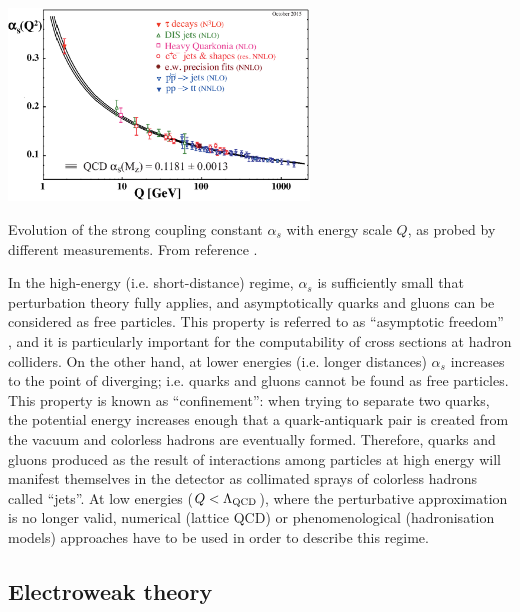 \bfig[h!]
\centering
\includegraphics[width=0.6\textwidth]{figures/Theory/asq-2015.eps}
\captionsetup{width=0.85\textwidth} \caption{\small Evolution of the strong coupling constant $\alpha_s$ with energy scale $Q$, as probed by different measurements. From reference \cite{Bethke:2015etp}.}
\label{sec:theo:fig:alpha}
\efig


In the high-energy (i.e. short-distance) regime, $\alpha_{s}$ is sufficiently small that perturbation theory fully applies, and asymptotically quarks and gluons can be considered as free particles. This property is referred to as ``asymptotic freedom'' \cite{Politzer:1973fx,Gross:1973id}, and it is particularly important for the computability of cross sections at hadron colliders.
On the other hand, at lower energies (i.e. longer distances) $\alpha_{s}$ increases to the point of diverging; i.e. quarks and gluons cannot be found as free particles. This property is known as ``confinement'': when trying to separate two quarks, the potential energy increases enough that a quark-antiquark pair is created from the vacuum and colorless hadrons are eventually formed. Therefore, quarks and gluons produced as the result of interactions among particles at high energy will manifest themselves in the detector as collimated sprays of colorless hadrons called ``jets''.
At low energies ($Q<\Lambda_{\rm QCD}$), where the perturbative approximation is no longer valid, numerical (lattice QCD) or phenomenological (hadronisation models) approaches have to be used in order to describe this regime.

\subsection{Electroweak theory}

